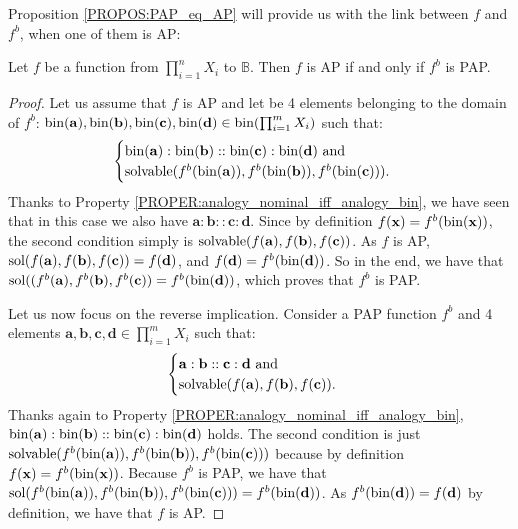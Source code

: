 Proposition \ref{PROPOS:PAP_eq_AP} will provide us with the link between $f$
and $f^b$, when one of them is AP:

\begin{proposition}
  \label{PROPOS:PAP_eq_AP}
Let $f$ be a function from $\prod_{i=1}^n X_i$ to $\mathbb{B}$. Then $f$ is AP
if and only if $f^b$ is PAP.
\end{proposition}
\begin{proof}
  Let us assume that $f$ is AP and let be 4 elements belonging to the domain of
  $f^b$: $\text{bin}(\mathbf{a}),\text{bin}(\mathbf{b}), \text{bin}(\mathbf{c}), \text{bin}(\mathbf{d})
  \in \text{bin}(\prod_{i=1}^m X_i)$ such that:
  $$\begin{cases}
    \text{bin}(\mathbf{a}):\text{bin}(\mathbf{b})::\text{bin}(\mathbf{c}):\text{bin}(\mathbf{d}) \mbox{
      and}\\
    \text{solvable}(f^b(\text{bin}(\mathbf{a})),f^b(\text{bin}(\mathbf{b})),f^b(\text{bin}(\mathbf{c}))).
  \end{cases}
  $$
Thanks to Property \ref{PROPER:analogy_nominal_iff_analogy_bin}, we have seen
  that in this case we also have
  $\mathbf{a}:\mathbf{b}::\mathbf{c}:\mathbf{d}$.  Since by definition
  $f(\mathbf{x}) = f^b(\text{bin}(\mathbf{x}))$,  the second condition simply is
  $\text{solvable}(f(\mathbf{a}),f(\mathbf{b}),f(\mathbf{c}))$. As $f$ is AP,
  $\text{sol}(f(\mathbf{a}),f(\mathbf{b}),f(\mathbf{c}))= f(\mathbf{d})$, and
  $f(\mathbf{d}) = f^b(\text{bin}(\mathbf{d}))$. So in the end, we have that
  $\text{sol}((f^b(\mathbf{a}),f^b(\mathbf{b}),f^b(\mathbf{c})) =
  f^b(\text{bin}(\mathbf{d}))$, which proves that $f^b$ is PAP.

  Let us now focus on the reverse implication. Consider a PAP function
  $f^b$ and 4 elements $\mathbf{a}, \mathbf{b}, \mathbf{c}, \mathbf{d} \in
  \prod_{i=1}^m X_i$ such that:
  $$
  \begin{cases}
  \mathbf{a}:\mathbf{b}::\mathbf{c}:\mathbf{d} \mbox{ and}\\
  \text{solvable}(f(\mathbf{a}),f(\mathbf{b}),f(\mathbf{c})).
  \end{cases}
  $$
  Thanks again to Property \ref{PROPER:analogy_nominal_iff_analogy_bin},
  $\text{bin}(\mathbf{a}):\text{bin}(\mathbf{b})::\text{bin}(\mathbf{c}):\text{bin}(\mathbf{d})$ holds. 
  The second condition is just
  $\text{solvable}(f^b(\text{bin}(\mathbf{a})),f^b(\text{bin}(\mathbf{b})),f^b(\text{bin}(\mathbf{c})))$
  because by definition $f(\mathbf{x}) = f^b(\text{bin}(\mathbf{x}))$. Because
  $f^b$ is PAP, we have that
  $\text{sol}(f^b(\text{bin}(\mathbf{a})),f^b(\text{bin}(\mathbf{b})),f^b(\text{bin}(\mathbf{c}))) =
  f^b(\text{bin}(\mathbf{d}))$. As $f^b(\text{bin}(\mathbf{d}))=f(\mathbf{d})$ by
  definition, we have that $f$ is AP.
\end{proof}

